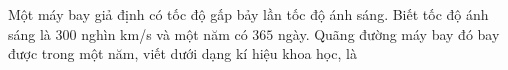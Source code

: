 \begin{ex}
Một máy bay giả định có tốc độ gấp bảy lần tốc độ ánh sáng. Biết tốc độ ánh sáng là $300$ nghìn km/s và một năm có $365$ ngày. Quãng đường máy bay đó bay được trong một năm, viết dưới dạng kí hiệu khoa học, là
\end{ex}
